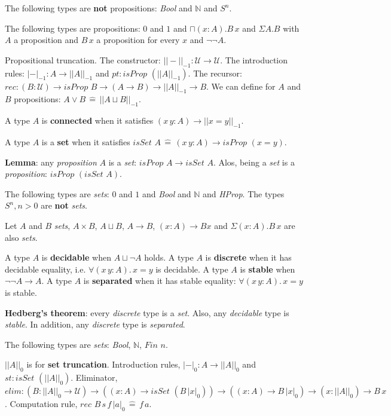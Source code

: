 \documentclass[a4paper]{article}
\begin{document}
The following types are \textbf{not }propositions: \textit{Bool} and $\mathbb{N}$ and $S^n$.

The following types are propositions: $0$ and $1$ and $\sqcap(x : A). B \, x$ and $\Sigma A. B$ with $A$ a proposition and $B \, x$ a proposition for every $x$ and $\neg\neg A$.

Propositional truncation. The constructor: $|| - ||_{-1} : \mathcal{U} \to \mathcal{U}$. The introduction rules: $|-|_{-1}: A \to || A ||_{-1}$ and $\textit{pt}: \textit{isProp }(|| A ||_{-1})$. The recursor: $\textit{rec}: (B : \mathcal{U}) \to \textit{isProp } B \to (A \to B) \to || A ||_{-1} \to B$. We can define for $A$ and $B$ propositions: $A \vee B \, \hat{=} \, || A \sqcup B ||_{-1}$.

A type $A$ is \textbf{connected} when it satisfies $(x \, y : A) \to || x = y ||_{-1}$.

A type $A$ is a \textbf{set} when it satisfies $\textit{isSet } A \, \hat{=} \, (x \, y : A) \to \textit{isProp }(x = y)$.

\textbf{Lemma}: any \textit{proposition} $A$ is a \textit{set}: $\textit{isProp } A \to \textit{isSet } A$. Alos, being a \textit{set} is a \textit{proposition}: $\textit{isProp }(\textit{isSet } A)$.

The following types are \textit{sets}: $0$ and $1$ and \textit{Bool} and $\mathbb{N}$ and \textit{HProp}. The types $S^n, n > 0$ are \textbf{not }\textit{sets}.

Let $A$ and $B$ \textit{sets}, $A \times B$, $A \sqcup B$, $A \to B$, $(x : A) \to B x$ and $\Sigma(x : A). B \, x$ are also \textit{sets}.

A type $A$ is \textbf{decidable} when $A \sqcup \neg A$ holds. A type $A$ is \textbf{discrete} when it has decidable equality, i.e. $\forall (x \, y : A). \, x = y$ is decidable. A type $A$ is \textbf{stable} when $\neg \neg A \to A$. A type $A$ is \textbf{separated} when it has stable equality: $\forall (x \, y : A). \, x = y$ is stable.

\textbf{Hedberg's theorem}: every \textit{discrete} type is a \textit{set}. Also, any \textit{decidable} type is \textit{stable}. In addition, any \textit{discrete} type is \textit{separated}.

The following types are \textit{sets}: \textit{Bool}, $\mathbb{N}$, $\textit{Fin } n$.

$|| A ||_0$ is for \textbf{set truncation}. Introduction rules, $|-|_0 : A \to || A ||_0$ and $\textit{st}: \textit{isSet }(|| A ||_0)$. Eliminator, $\textit{elim}: (B : ||A||_0 \to \mathcal{U}) \to ((x : A) \to \textit{isSet }(B \, |x|_0)) \to ((x : A) \to B \, |x|_0) \to (x : || A ||_0) \to B \, x$. Computation rule, $\textit{rec } B \, s \, f \, |a|_0 \, \hat{=} \, f \, a$.
\end{document}
